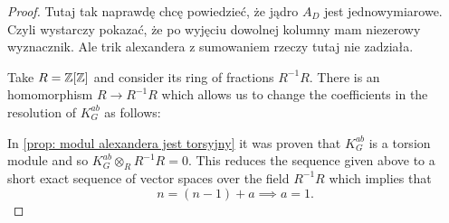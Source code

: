 \begin{proof}{\color{blue}
  Tutaj tak naprawdę chcę powiedzieć, że jądro $A_D$ jest jednowymiarowe. Czyli wystarczy pokazać, że po wyjęciu dowolnej kolumny mam niezerowy wyznacznik. Ale trik alexandera z sumowaniem rzeczy tutaj nie zadziała.




  Take $R=\operatorname{\mathbb{Z}}[\operatorname{\mathbb{Z}}]$ and consider its ring of fractions $R^{-1}R$. There is an homomorphism $R\to R^{-1}R$ which allows us to change the coefficients in the resolution of $K_G^{ab}$ as follows:
  \begin{center}
  \end{center}
  In \cref{prop: modul alexandera jest torsyjny} it was proven that $K_G^{ab}$ is a torsion module and so $K_G^{ab}\otimes_R R^{-1}R=0$. This reduces the sequence given above to a short exact sequence of vector spaces over the field $R^{-1}R$ which implies that 
$$n=(n-1)+a\implies a=1.$$}
\end{proof}


